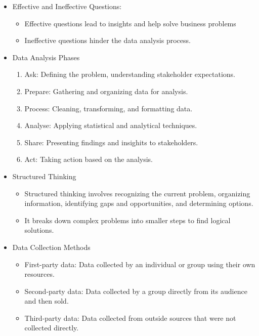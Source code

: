 \documentclass[a4paper]{article}
\begin{document}
    \begin{itemize}
        \item Effective and Ineffective Questions: 
            \begin{itemize}
                \item Effective questions lead to insights and help solve business problems
                \item Ineffective questions hinder the data analysis process.
            \end{itemize}
        \item Data Analysis Phases 
            \begin{enumerate}
                \item Ask: Defining the problem, understanding stakeholder expectations.
                \item Prepare: Gathering and organizing data for analysis. 
                \item Process: Cleaning, transforming, and formatting data. 
                \item Analyse: Applying statistical and analytical techniques. 
                \item Share: Presenting findings and insighits to stakeholders.
                \item Act: Taking action based on the analysis.
            \end{enumerate}
        \item Structured Thinking
            \begin{itemize}
                \item Structured thinking involves recognizing the current problem, organizing information, identifying gaps and opportunities, and determining options.
                \item It breaks down complex problems into smaller steps to find logical solutions.
            \end{itemize}
        \item Data Collection Methods
            \begin{itemize}
                \item First-party data: Data collected by an individual or group using their own resources.
                \item Second-party data: Data collected by a group directly from its audience and then sold.
                \item Third-party data: Data collected from outside sources that were not collected directly.
            \end{itemize}


\end{itemize}
\end{document}
